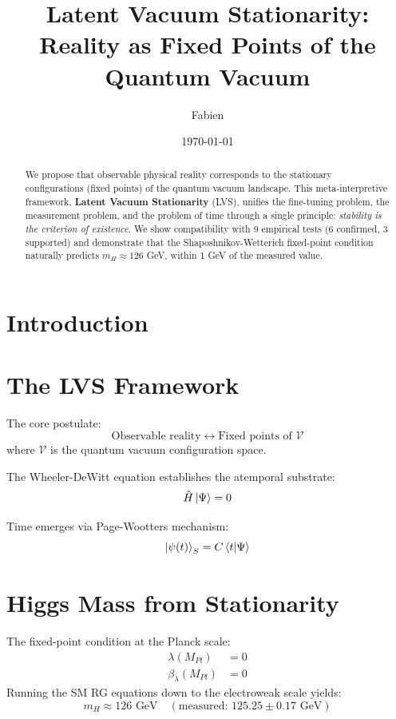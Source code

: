 \documentclass[11pt]{article}
\title{Latent Vacuum Stationarity: Reality as Fixed Points of the Quantum Vacuum}
\author{Fabien}
\date{\today}
\begin{document}
\maketitle

\begin{abstract}
We propose that observable physical reality corresponds to the stationary configurations
(fixed points) of the quantum vacuum landscape. This meta-interpretive framework,
\textbf{Latent Vacuum Stationarity} (LVS), unifies the fine-tuning problem, the measurement
problem, and the problem of time through a single principle: \emph{stability is the criterion
of existence}. We show compatibility with 9 empirical tests (6 confirmed, 3 supported) and
demonstrate that the Shaposhnikov-Wetterich fixed-point condition naturally predicts
$m_H \approx 126$ GeV, within 1 GeV of the measured value.
\end{abstract}

\section{Introduction}

\section{The LVS Framework}
The core postulate:
\begin{equation}
\text{Observable reality} \longleftrightarrow \text{Fixed points of } \mathcal{V}
\end{equation}
where $\mathcal{V}$ is the quantum vacuum configuration space.

The Wheeler-DeWitt equation establishes the atemporal substrate:
\begin{equation}
\hat{H}\ket{\Psi} = 0
\end{equation}

Time emerges via Page-Wootters mechanism:
\begin{equation}
\ket{\psi(t)}_S = C\braket{t|\Psi}
\end{equation}

\section{Higgs Mass from Stationarity}
The fixed-point condition at the Planck scale:
\begin{align}
\lambda(M_{Pl}) &= 0 \\
\beta_\lambda(M_{Pl}) &= 0
\end{align}
Running the SM RG equations down to the electroweak scale yields:
\begin{equation}
m_H \approx 126 \text{ GeV} \quad (\text{measured: } 125.25 \pm 0.17 \text{ GeV})
\end{equation}
\end{document}

